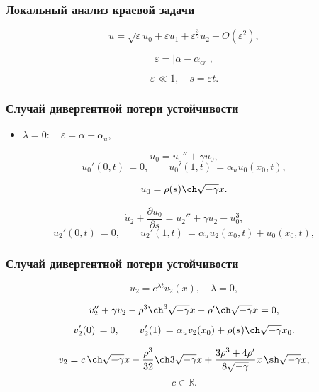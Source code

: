 \documentclass[fullscreen=true, unicode, bookmarks=false]{beamer}
\begin{document}
\begin{frame}
\frametitle{ Локальный анализ краевой задачи }

\begin{equation}
	u = \sqrt{\varepsilon}u_0 + \varepsilon u_1 + \varepsilon^{\frac{3}{2}} u_2 + O(\varepsilon^2),
\end{equation}

\bigskip

$$ \varepsilon = | \alpha - \alpha_{cr} |, $$

$$ \varepsilon \ll 1, \quad s = \varepsilon t. $$

\end{frame}

\begin{frame}
\frametitle{ Случай дивергентной потери устойчивости }

\begin{itemize}
\item { $ \lambda = 0: \quad \varepsilon=\alpha-\alpha_u, $
}
\end{itemize}

\medskip

\begin{equation}
	u_0 = u_0'' + \gamma u_0,
\end{equation}
\begin{equation}
	u_0'(0, t) \, = 0, \qquad u_0'(1, t) \, = \alpha_u u_0(x_0, t),
\end{equation}

$$ u_0 = \rho(s) \ch \sqrt{-\gamma} x. $$

\medskip

\begin{equation}
	\dot u_2 + \frac{\partial u_0}{\partial s} = u_2'' + \gamma u_2 - u_0^3,
\end{equation}
\begin{equation}
	u_2'(0, t) \, = 0, \qquad u_2'(1, t) \, = \alpha_u u_2(x_0, t) + u_0(x_0, t),
\end{equation}

\end{frame}

\begin{frame}
\frametitle{ Случай дивергентной потери устойчивости }

$$ u_2 = e^{\lambda t}v_2(x), \quad \lambda = 0, $$

\medskip

\begin{equation}
	v_2'' + \gamma v_2 - \rho^3 \ch^3 \sqrt{-\gamma} x - \rho' \ch \sqrt{-\gamma} x = 0,
\end{equation}
\begin{equation}
	v_2'(0) \, = 0, \qquad v_2'(1) \, = \alpha_u v_2(x_0) + \rho(s) \ch \sqrt{-\gamma} x_0.
\end{equation}

\medskip

$$ v_2 = c \, \ch \sqrt{-\gamma} x - \frac{\rho^3}{32} \ch 3\sqrt{-\gamma} x + \frac{3\rho^3 + 4\rho'}{8\sqrt{-\gamma}} x \, \sh \sqrt{-\gamma} x, $$
$$ c \in \mathbb{R}. $$

\end{frame}
\end{document}
